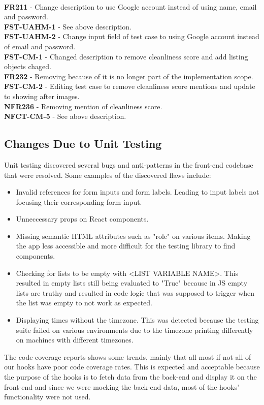 \documentclass[12pt, titlepage]{article}
\begin{document}
\\
\textbf{FR211} - Change description to use Google account instead of using name, email and password.\\
\textbf{FST-UAHM-1} - See above description. \\
\textbf{FST-UAHM-2} - Change input field of test case to using Google account instead of email and password. \\
\textbf{FST-CM-1} - Changed description to remove cleanliness score and add listing objects chaged. \\
\textbf{FR232} - Removing because of it is no longer part of the implementation scope. \\
\textbf{FST-CM-2} - Editing test case to remove cleanliness score mentions and update to showing after images. \\
\textbf{NFR236} - Removing mention of cleanliness score. \\
\textbf{NFCT-CM-5} - See above description. \\



\subsection{Changes Due to Unit Testing}
Unit testing discovered several bugs and anti-patterns in the front-end codebase that were resolved. Some examples of the discovered flaws include:
\begin{itemize}
\item Invalid references for form inputs and form labels. Leading to input labels not focusing their corresponding form input.
\item Unneccessary props on React components.
\item Missing semantic HTML attributes such as "role" on various items. Making the app less accessible and more difficult for the testing library to find components.
\item Checking for lists to be empty with <LIST VARIABLE NAME>. This resulted in empty lists still being evaluated to "True" because in JS empty lists are truthy and resulted in code logic that was supposed to trigger when the list was empty to not work as expected.
\item Displaying times without the timezone. This was detected because the testing suite failed on various environments due to the timezone printing differently on machines with different timezones.
\end{itemize}
The code coverage reports shows some trends, mainly that all most if not all of our hooks have poor code coverage rates. This is expected and acceptable because the purpose of the hooks is to fetch data from the back-end and display it on the front-end and since we were mocking the back-end data, most of the hooks' functionality were not used.
\end{document}
